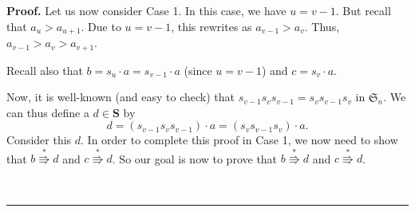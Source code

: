 \documentclass[numbers=enddot,12pt,final,onecolumn,notitlepage]{scrartcl}%
\theoremstyle{definition}
\newenvironment{proof}[1][Proof]{\noindent\textbf{#1.} }{\ \rule{0.5em}{0.5em}}
\begin{document}
\begin{proof}
Let us now consider Case 1. In this case, we have $u=v-1$. But recall that
$a_{u}>a_{u+1}$. Due to $u=v-1$, this rewrites as $a_{v-1}>a_{v}$. Thus,
$a_{v-1}>a_{v}>a_{v+1}$.

Recall also that $b=s_{u}\cdot a=s_{v-1}\cdot a$ (since $u=v-1$) and
$c=s_{v}\cdot a$.

Now, it is well-known (and easy to check) that $s_{v-1}s_{v}s_{v-1}%
=s_{v}s_{v-1}s_{v}$ in $\mathfrak{S}_{n}$. We can thus define a $d\in
\mathbf{S}$ by%
\[
d=\left(  s_{v-1}s_{v}s_{v-1}\right)  \cdot a=\left(  s_{v}s_{v-1}%
s_{v}\right)  \cdot a.
\]
Consider this $d$. In order to complete this proof in Case 1, we now need to
show that $b\overset{\ast}{\Rrightarrow}d$ and $c\overset{\ast}{\Rrightarrow
}d$. So our goal is now to prove that $b\overset{\ast}{\Rrightarrow}d$ and
$c\overset{\ast}{\Rrightarrow}d$.


\end{proof}
\end{document}
